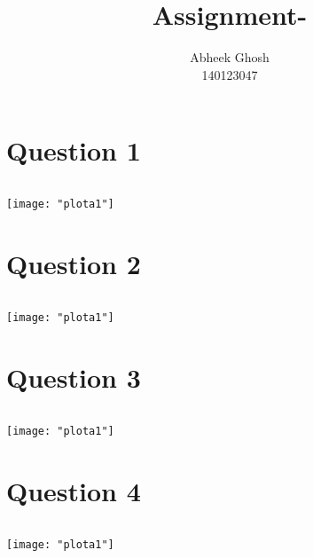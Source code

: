 \documentclass{article}
\begin{document}
	\title{\textbf{Assignment-}}
	\author{Abheek Ghosh \\ 
		140123047 }
	
	\maketitle
	

\section{Question 1}


\begin{lstlisting}

\end{lstlisting}

\texttt{[image: "plota1"]}
\pagebreak


\section{Question 2}


\begin{lstlisting}

\end{lstlisting}

\texttt{[image: "plota1"]}
\pagebreak

\section{Question 3}


\begin{lstlisting}

\end{lstlisting}

\texttt{[image: "plota1"]}
\pagebreak

\section{Question 4}


\begin{lstlisting}

\end{lstlisting}

\texttt{[image: "plota1"]}
\pagebreak
\end{document}
